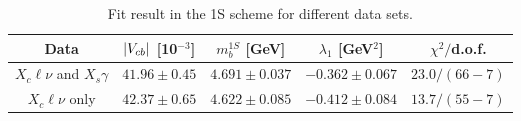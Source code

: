 \begin{table}[!htb]
\caption{Fit result in the 1S scheme for different data
  sets.} \label{tab:gf_res_1s}
\begin{center}
\begin{tabular}{|c|c|c|c|c|}
  \hline
  Data & $|V_{cb}|$ [10$^{-3}$] & $m_b^{1S}$ [GeV] &
  $\lambda_1$ [GeV$^2$] & $\chi^2/$d.o.f.\\
  \hline \hline
  $X_c\ell\nu$ and $X_s\gamma$ & $41.96\pm 0.45$ & $4.691\pm 0.037$ &
  $-0.362\pm 0.067$ & $23.0/(66-7)$\\
  $X_c\ell\nu$ only & $42.37\pm 0.65$ & $4.622\pm 0.085$ & $-0.412\pm
  0.084$ & $13.7/(55-7)$\\
  \hline
\end{tabular}
\end{center}
\end{table}
